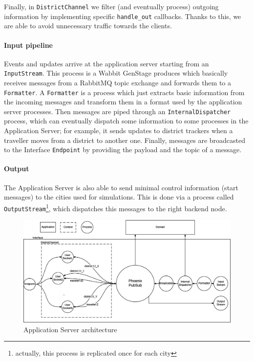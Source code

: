 Finally, in \texttt{DistrictChannel} we filter (and eventually process)
outgoing information by implementing specific \texttt{handle\_out} callbacks.
Thanks to this, we are able to avoid unnecessary traffic towards the clients.

\paragraph{Input pipeline}
Events and updates arrive at the application server starting from an
\texttt{InputStream}. This process is a Wabbit GenStage produces which
basically receives messages from a RabbitMQ topic exchange and forwards them
to a \texttt{Formatter}.
A \texttt{Formatter} is a process which just extracts basic information from
the incoming messages and transform them in a format used by the application
server processes.
Then messages are piped through an \texttt{InternalDispatcher} process, which
can eventually dispatch some information to some processes in the Application
Server; for example, it sends updates to district trackers when a traveller
moves from a district to another one.
Finally, messages are broadcasted to the Interface \texttt{Endpoint} by
providing the payload and the topic of a message.

\paragraph{Output}
The Application Server is also able to send minimal control information (start
messages) to the cities used for simulations. This is done via a process called
\texttt{OutputStream}\footnote{actually, this process is replicated once for
each city}, which dispatches this messages to the right backend node.

\begin{figure}[H]
  \centering
  \includegraphics[width=1.1\columnwidth]{images/implementation/as-chan-pubsub.eps}
  \caption{Application Server architecture}
  \label{fig:impl-as-pubsub}
\end{figure}
